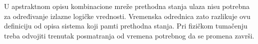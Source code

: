 U apstraktnom opisu kombinacione mreže prethodna stanja ulaza nisu potrebna za određivanje izlazne logičke vrednosti. Vremenska odrednica zato razlikuje ovu definiciju od opisa sistema koji pamti prethodna stanja. Pri fizičkom tumačenju treba odvojiti trenutak posmatranja od vremena potrebnog da se promena završi.
